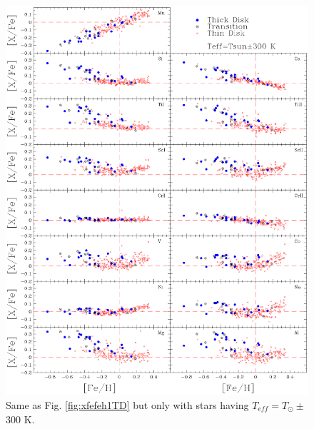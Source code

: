 \documentclass[oldversion]{aa}
\begin{document}
\begin{figure}[t!]
\centering
\includegraphics[trim=0cm 1.3cm 0cm 1.3cm,clip,width=17 cm]{pics/xfefehtsol300paperv3TD.eps}
\caption[abundance gfx for solar temperatures]{Same as Fig. \ref{fig:xfefeh1TD} but only with stars having $T_{eff}=T_\odot\pm$300 K.}
\label{fig:xfefeh2TD}
\end{figure}
\end{document}
